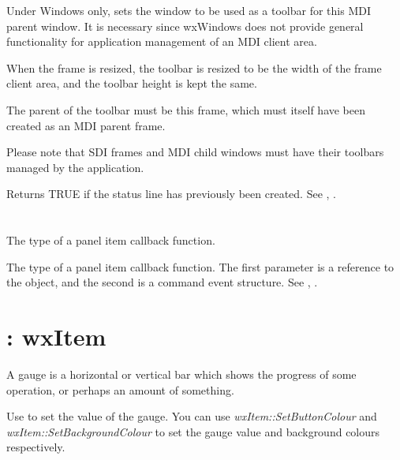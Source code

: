 
Under Windows only, sets the window to be used as a toolbar for this
MDI parent window. It is necessary since wxWindows does not provide
general functionality for application management of an MDI client area.

When the frame is resized, the toolbar is resized to be the width of
the frame client area, and the toolbar height is kept the same.

The parent of the toolbar must be this frame, which must itself have
been created as an MDI parent frame.

Please note that SDI frames and MDI child windows must have their
toolbars managed by the application.

\label{wxframestatuslineexists}


Returns TRUE if the status line has previously been created.
See , .

\section{}\label{wxfunction}

The type of a panel item callback function.



The type of a panel item callback function. The first parameter is a reference
to the object, and the second is a command event structure.
See , .

\section{: wxItem}\label{wxgauge}

A gauge is a horizontal or vertical bar which shows the progress of
some operation, or perhaps an amount of something.

Use  to set the value of
the gauge. You can use {\it wxItem::SetButtonColour} and {\it wxItem::SetBackgroundColour} to
set the gauge value and background colours respectively.

